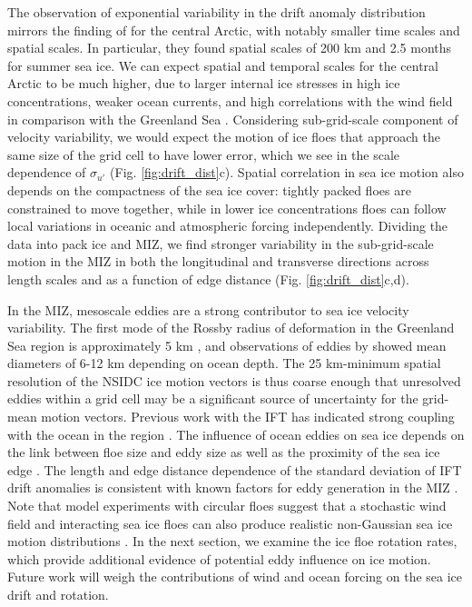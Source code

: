 \documentclass[review, jog]{igs}
\begin{document}
The observation of exponential variability in the drift anomaly distribution mirrors the finding of \cite{rampal2009_turbulentFluctuations} for the central Arctic, with notably smaller time scales and spatial scales. In particular, they found spatial scales of 200 km and 2.5 months for summer sea ice.
We can expect spatial and temporal scales for the central Arctic to be much higher, due to larger internal ice stresses in high ice concentrations, weaker ocean currents, and high correlations with the wind field in comparison with the Greenland Sea \citep{rampal2009_turbulentFluctuations, thorndikeSeaIceMotion1982}.
Considering sub-grid-scale component of velocity variability, we would expect the motion of ice floes that approach the same size of the grid cell to have lower error, which we see in the scale dependence of $\sigma_{u'}$ (Fig. \ref{fig:drift_dist}c).
Spatial correlation in sea ice motion also depends on the compactness of the sea ice cover: tightly packed floes are constrained to move together, while in lower ice concentrations floes can follow local variations in oceanic and atmospheric forcing independently. 
Dividing the data into pack ice and MIZ, we find stronger variability in the sub-grid-scale motion in the MIZ in both the longitudinal and transverse directions across length scales and as a function of edge distance (Fig. \ref{fig:drift_dist}c,d).

In the MIZ, mesoscale eddies are a strong contributor to sea ice velocity variability.
The first mode of the Rossby radius of deformation in the Greenland Sea region is approximately 5 km \citep{nurser2014_RossbyRadius}, and observations of eddies by \cite{kozlov2021_EddiesMarginal} showed mean diameters of 6-12 km depending on ocean depth.
The 25 km-minimum spatial resolution of the NSIDC ice motion vectors is thus coarse enough that unresolved eddies within a grid cell may be a significant source of uncertainty for the grid-mean motion vectors.
Previous work with the IFT has indicated strong coupling with the ocean in the region \citep{lopez-acostaSeaIceDrift2021, watkins2023_EvidenceAbrupt}.
The influence of ocean eddies on sea ice depends on the link between floe size and eddy size \citep{brenner2023_ScaleDependentAirSea, kim2025_CharacterisationSea} as well as the proximity of the sea ice edge \citep{johannessen1987_IceEdgeEddies}.
The length and edge distance dependence of the standard deviation of IFT drift anomalies is consistent with known factors for eddy generation in the MIZ \citep{kozlov2021_EddiesMarginal, piccolo2024_EnergeticsTransfer}.
Note that model experiments with circular floes suggest that a stochastic wind field and interacting sea ice floes can also produce realistic non-Gaussian sea ice motion distributions \citep{shaddy2025_WinddrivenCollisions}.
In the next section, we examine the ice floe rotation rates, which provide additional evidence of potential eddy influence on ice motion.
Future work will weigh the contributions of wind and ocean forcing on the sea ice drift and rotation.
\end{document}
